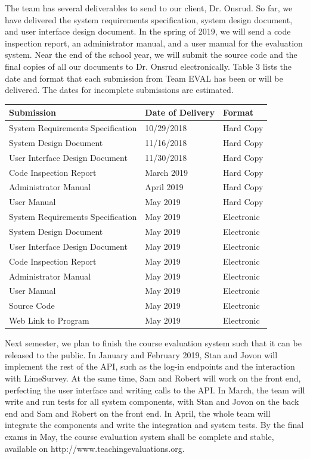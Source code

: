 \documentclass{article}
\begin{document}
The team has several deliverables to send to our client, Dr. Onsrud. So far, we have delivered the system requirements specification, system design document, and user interface design document. In the spring of 2019, we will send a code inspection report, an administrator manual, and a user manual for the evaluation system. Near the end of the school year, we will submit the source code and the final copies of all our documents to Dr. Onsrud electronically. Table 3 lists the date and format that each submission from Team EVAL has been or will be delivered. The dates for incomplete submissions are estimated.
\newpage

\begin{center}
\begin{tabular}{|p{6cm}|p{3cm}|p{3cm}|} 
\hline
\textbf{Submission} & \textbf{Date of Delivery} & \textbf{Format} \\
\hline
System Requirements Specification & 10/29/2018 & Hard Copy\\ 
\hline
System Design Document & 11/16/2018 & Hard Copy\\ 
\hline
User Interface Design Document & 11/30/2018 & Hard Copy\\ 
\hline
Code Inspection Report & March 2019 & Hard Copy\\ 
\hline
Administrator Manual & April 2019 & Hard Copy\\ 
\hline
User Manual & May 2019 & Hard Copy\\ 
\hline
System Requirements Specification & May 2019 & Electronic\\ 
\hline
System Design Document & May 2019 & Electronic\\ 
\hline
User Interface Design Document & May 2019 & Electronic\\ 
\hline
Code Inspection Report & May 2019 & Electronic\\ 
\hline
Administrator Manual & May 2019 & Electronic\\ 
\hline
User Manual & May 2019 & Electronic\\ 
\hline
Source Code & May 2019 & Electronic\\ 
\hline
Web Link to Program & May 2019 & Electronic\\ 
\hline
\end{tabular}
\end{center}

Next semester, we plan to finish the course evaluation system such that it can be released to the public. In January and February 2019, Stan and Jovon will implement the rest of the API, such as the log-in endpoints and the interaction with LimeSurvey. At the same time, Sam and Robert will work on the front end, perfecting the user interface and writing calls to the API. In March, the team will write and run tests for all system components, with Stan and Jovon on the back end and Sam and Robert on the front end. In April, the whole team will integrate the components and write the integration and system tests. By the final exams in May, the course evaluation system shall be complete and stable, available on http://www.teachingevaluations.org.
\end{document}
